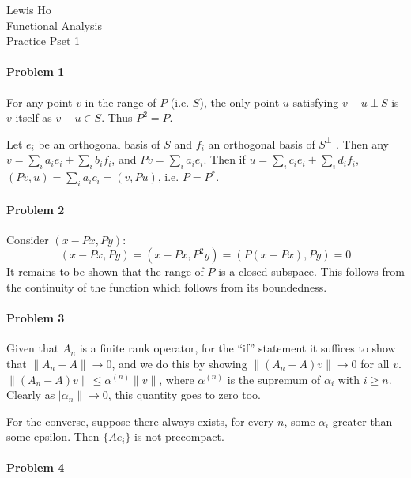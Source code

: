 \documentclass[11pt]{article}
\begin{document}
\begin{flushleft}
  Lewis Ho\\
  Functional Analysis\\
  Practice Pset 1
\end{flushleft}


\paragraph{Problem 1}

For any point $v$ in the range of $P$ (i.e. $S$), the only point $u$ satisfying
$v-u\ \bot\ S$ is $v$ itself as $v-u \in S$. Thus $P^2 = P$.

Let $e_i$ be an orthogonal basis of $S$ and $f_i$ an orthogonal basis of $S^\bot$
. Then any $v = \sum_i a_ie_i + \sum_i b_if_i$, and $Pv = \sum_i a_ie_i$. Then
if $u = \sum_i c_ie_i + \sum_i d_if_i$, $(Pv, u) = \sum_i a_ic_i = (v, Pu)$, i.e.
$P = P^*$.

\paragraph{Problem 2}

Consider $(x - Px, Py)$:
\begin{displaymath}
  (x-Px,Py)=(x-Px,P^2y)=(P(x-Px),Py)=0
\end{displaymath}
It remains to be shown that the range of $P$ is a closed subspace. This follows
from the continuity of the function which follows from its boundedness.

\paragraph{Problem 3}

Given that $A_n$ is a finite rank operator, for the ``if'' statement it suffices
to show that $\|A_n-A\| \to 0$, and we do this by showing $\|(A_n-A)v\| \to 0$
for all $v$. $\|(A_n-A)v\| \leq \alpha^{(n)}\|v\|$, where $\alpha^{(n)}$ is the
supremum of $\alpha_i$ with $i \geq n$. Clearly as $|\alpha_n\| \to 0$, this
quantity goes to zero too.

For the converse, suppose there always exists, for every $n$, some $\alpha_i$
greater than some epsilon. Then $\{Ae_i\}$ is not precompact.

\paragraph{Problem 4}
\end{document}
